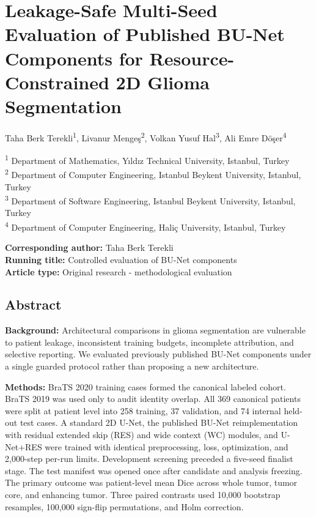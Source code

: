 \documentclass[
  10pt,
  letterpaper,
]{article}
\author{}
\date{}
\begin{document}
\section{Leakage-Safe Multi-Seed Evaluation of Published BU-Net
Components for Resource-Constrained 2D Glioma
Segmentation}\label{leakage-safe-multi-seed-evaluation-of-published-bu-net-components-for-resource-constrained-2d-glioma-segmentation}

Taha Berk Terekli\textsuperscript{1}, Livanur Mengeş\textsuperscript{2},
Volkan Yusuf Hal\textsuperscript{3}, Ali Emre Döşer\textsuperscript{4}

\textsuperscript{1} Department of Mathematics, Yıldız Technical
University, Istanbul, Turkey\\
\textsuperscript{2} Department of Computer Engineering, Istanbul Beykent
University, Istanbul, Turkey\\
\textsuperscript{3} Department of Software Engineering, Istanbul Beykent
University, Istanbul, Turkey\\
\textsuperscript{4} Department of Computer Engineering, Haliç
University, Istanbul, Turkey

\textbf{Corresponding author:} Taha Berk Terekli\\
\textbf{Running title:} Controlled evaluation of BU-Net components\\
\textbf{Article type:} Original research - methodological evaluation

\subsection{Abstract}\label{abstract}

\textbf{Background:} Architectural comparisons in glioma segmentation
are vulnerable to patient leakage, inconsistent training budgets,
incomplete attribution, and selective reporting. We evaluated previously
published BU-Net components under a single guarded protocol rather than
proposing a new architecture.

\textbf{Methods:} BraTS 2020 training cases formed the canonical labeled
cohort. BraTS 2019 was used only to audit identity overlap. All 369
canonical patients were split at patient level into 258 training, 37
validation, and 74 internal held-out test cases. A standard 2D U-Net,
the published BU-Net reimplementation with residual extended skip (RES)
and wide context (WC) modules, and U-Net+RES were trained with identical
preprocessing, loss, optimization, and 2,000-step per-run limits.
Development screening preceded a five-seed finalist stage. The test
manifest was opened once after candidate and analysis freezing. The
primary outcome was patient-level mean Dice across whole tumor, tumor
core, and enhancing tumor. Three paired contrasts used 10,000 bootstrap
resamples, 100,000 sign-flip permutations, and Holm correction.
\end{document}
